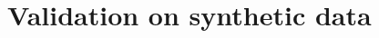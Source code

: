 \documentclass[twoside]{article}
\begin{document}





\section{Validation on synthetic data}
\label{sec:synthetic}
\end{document}
